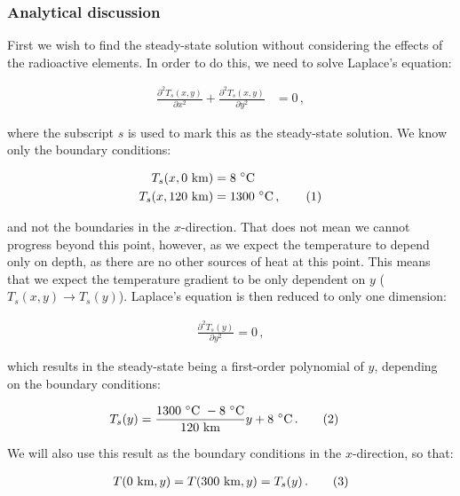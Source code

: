 \documentclass[reprint,english,notitlepage]{revtex4-1}  %
\newcommand\numberthis{\addtocounter{equation}{1}\tag{\theequation}}
\begin{document}
\subsubsection{Analytical discussion} \label{sec:formalism_heat_eq_with_source_term_analytical_sol}

First we wish to find the steady-state solution without considering the effects of the radioactive elements. In order to do this, we need to solve Laplace's equation:

\begin{align*}
\frac{\partial^2 T_s(x,y)}{\partial x^2} + \frac{\partial^2 T_s(x,y)}{\partial y^2} &= 0 \, ,
\end{align*}

where the subscript $s$ is used to mark this as the steady-state solution. We know only the boundary conditions:

\begin{align*}
T_s(x,0 \text{ km}) &= 8 \text{ } ^\circ\text{C} \\
T_s(x,120 \text{ km}) &= 1300 \text{ } ^\circ\text{C} \, , \numberthis \label{eq:heat_boundary_conditions_y}
\end{align*} 

and not the boundaries in the $x$-direction. That does not mean we cannot progress beyond this point, however, as we expect the temperature to depend only on depth, as there are no other sources of heat at this point. This means that we expect the temperature gradient to be only dependent on $y$ ($T_s(x,y) \to T_s(y)$). Laplace's equation is then reduced to only one dimension:

\begin{align*}
\frac{\partial^2 T_s(y)}{\partial y^2} = 0 \, ,
\end{align*}  

which results in the steady-state being a first-order polynomial of $y$, depending on the boundary conditions:

\begin{align*}
T_s(y) &= \frac{1300\text{ $^\circ$C }-8 \text{ $^\circ$C} }{120 \text{ km} } y + 8 \text{ $^\circ$C}\, . \numberthis \label{eq:steady_state_heat} 
\end{align*} 

We will also use this result as the boundary conditions in the $x$-direction, so that:

\begin{align*}
T(0 \text{ km},y) = T(300 \text{ km},y) = T_s(y) \, . \numberthis \label{eq:heat_boundary_conditions_x}
\end{align*}
\end{document}
